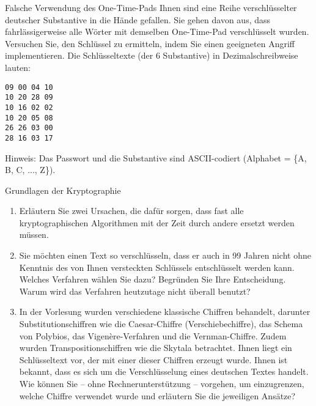 \documentclass{article}
\begin{document}
\begin{exercise}{Falsche Verwendung des One-Time-Pads}
  Ihnen sind eine Reihe verschlüsselter deutscher Substantive in die Hände gefallen. Sie gehen davon aus, dass fahrlässigerweise alle Wörter mit demselben One-Time-Pad verschlüsselt wurden. Versuchen Sie, den Schlüssel zu ermitteln, indem Sie einen geeigneten Angriff implementieren. Die Schlüsseltexte (der 6 Substantive) in Dezimalschreibweise lauten:

  \begin{center}
      \texttt{09 00 04 10} \\
      \texttt{10 20 28 09} \\
      \texttt{10 16 02 02} \\
      \texttt{10 20 05 08} \\
      \texttt{26 26 03 00} \\
      \texttt{28 16 03 17}
  \end{center}

  Hinweis: Das Passwort und die Substantive sind ASCII-codiert (Alphabet = \{A, B, C, ..., Z\}).

  \begin{solution}
  \end{solution}
\end{exercise}

\begin{exercise}{Grundlagen der Kryptographie}
  \begin{enumerate}
      \item Erläutern Sie zwei Ursachen, die dafür sorgen, dass fast alle kryptographischen Algorithmen mit der Zeit durch andere ersetzt werden müssen.
      \item Sie möchten einen Text so verschlüsseln, dass er auch in 99 Jahren nicht ohne Kenntnis des von Ihnen versteckten Schlüssels entschlüsselt werden kann. Welches Verfahren wählen Sie dazu? Begründen Sie Ihre Entscheidung. Warum wird das Verfahren heutzutage nicht überall benutzt?
      \item In der Vorlesung wurden verschiedene klassische Chiffren behandelt, darunter Substitutionschiffren wie die Caesar-Chiffre (Verschiebechiffre), das Schema von Polybios, das Vigenère-Verfahren und die Vernman-Chiffre. Zudem wurden Transpositionschiffren wie die Skytala betrachtet. Ihnen liegt ein Schlüsseltext vor, der mit einer dieser Chiffren erzeugt wurde. Ihnen ist bekannt, dass es sich um die Verschlüsselung eines deutschen Textes handelt. Wie können Sie – ohne Rechnerunterstützung – vorgehen, um einzugrenzen, welche Chiffre verwendet wurde und erläutern Sie die jeweiligen Ansätze?
  \end{enumerate}

  \begin{solution}
  \end{solution}
\end{exercise}
\end{document}
